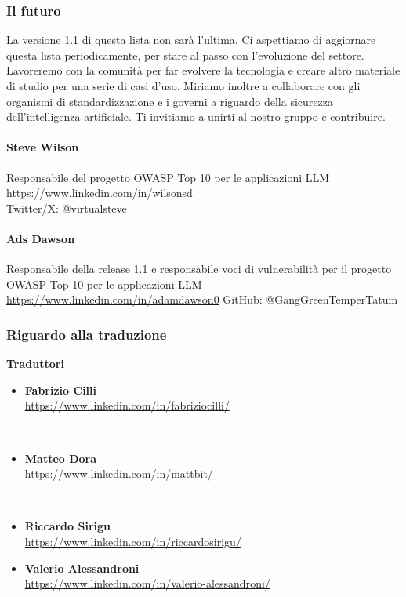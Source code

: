 \documentclass[
]{article}
\providecommand{\tightlist}{%
  \setlength{\itemsep}{0pt}\setlength{\parskip}{0pt}}
\begin{document}
\subsubsection{Il futuro}\label{il-futuro}

La versione 1.1 di questa lista non sarà l'ultima. Ci aspettiamo di
aggiornare questa lista periodicamente, per stare al passo con
l'evoluzione del settore. Lavoreremo con la comunità per far evolvere la
tecnologia e creare altro materiale di studio per una serie di casi
d'uso. Miriamo inoltre a collaborare con gli organismi di
standardizzazione e i governi a riguardo della sicurezza
dell'intelligenza artificiale. Ti invitiamo a unirti al nostro gruppo e
contribuire.

\paragraph{Steve Wilson}\label{steve-wilson}

Responsabile del progetto OWASP Top 10 per le applicazioni LLM
\href{https://www.linkedin.com/in/wilsonsd/}{https://www.linkedin.com/in/wilsonsd}\\
Twitter/X: @virtualsteve

\paragraph{Ads Dawson}\label{ads-dawson}

Responsabile della release 1.1 e responsabile voci di vulnerabilità per
il progetto OWASP Top 10 per le applicazioni LLM
\href{https://www.linkedin.com/in/adamdawson0/}{https://www.linkedin.com/in/adamdawson0}
GitHub: @GangGreenTemperTatum

\subsubsection{Riguardo alla traduzione}\label{riguardo-alla-traduzione}

\textbf{Traduttori}

\begin{itemize}
\tightlist
\item
  \textbf{Fabrizio Cilli}\\
  \url{https://www.linkedin.com/in/fabriziocilli/}\strut \\
\item
  \textbf{Matteo Dora}\\
  \url{https://www.linkedin.com/in/mattbit/}\strut \\
\item
  \textbf{Riccardo Sirigu}\\
  \url{https://www.linkedin.com/in/riccardosirigu/}
\item
  \textbf{Valerio Alessandroni}\\
  \url{https://www.linkedin.com/in/valerio-alessandroni/}
\end{itemize}
\end{document}
